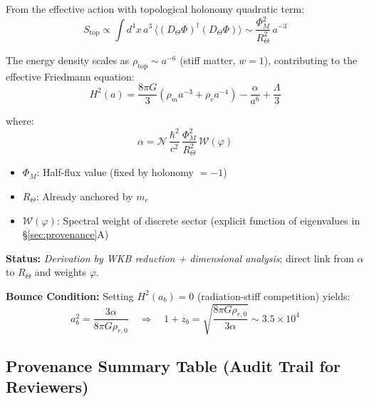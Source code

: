 \documentclass[12pt]{article}
\begin{document}
From the effective action with topological holonomy quadratic term:
\begin{equation}
S_{\text{top}} \propto \int d^4x \, a^3 \, \Big\langle (D_\Theta \Phi)^\dagger (D_\Theta \Phi) \Big\rangle \sim \frac{\Phi_M^2}{R_\Theta^2} \, a^{-3}
\end{equation}

The energy density scales as $\rho_{\text{top}} \sim a^{-6}$ (stiff matter, $w = 1$), contributing to the effective Friedmann equation:
\begin{equation}
H^2(a) = \frac{8\pi G}{3} \left(\rho_m a^{-3} + \rho_r a^{-4}\right) - \frac{\alpha}{a^6} + \frac{\Lambda}{3}
\end{equation}

where:
\begin{equation}
\alpha = \mathcal{N} \, \frac{\hbar^2}{c^2} \, \frac{\Phi_M^2}{R_\Theta^2} \, \mathcal{W}(\varphi)
\end{equation}

\begin{itemize}
\item $\Phi_M$: Half-flux value (fixed by holonomy $= -1$)
\item $R_\Theta$: Already anchored by $m_e$
\item $\mathcal{W}(\varphi)$: Spectral weight of discrete sector (explicit function of eigenvalues in \S\ref{sec:provenance}A)
\end{itemize}

\textbf{Status:} \textit{Derivation by WKB reduction + dimensional analysis}; direct link from $\alpha$ to $R_\Theta$ and weights $\varphi$.

\textbf{Bounce Condition:} Setting $H^2(a_b) = 0$ (radiation-stiff competition) yields:
\begin{equation}
a_b^2 = \frac{3\alpha}{8\pi G \rho_{r,0}} \quad \Rightarrow \quad 1+z_b = \sqrt{\frac{8\pi G \rho_{r,0}}{3\alpha}} \sim 3.5 \times 10^4
\end{equation}

\subsection{Provenance Summary Table (Audit Trail for Reviewers)}
\end{document}
